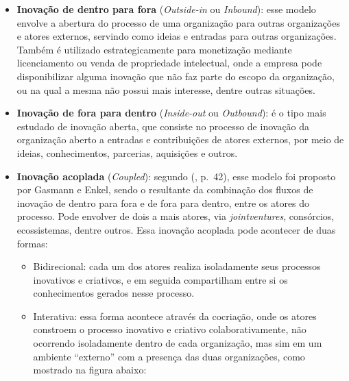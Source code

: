 \begin{itemize}
    \item \textbf{Inovação de dentro para fora} (\textit{Outside-in} ou \textit{Inbound}): esse modelo envolve a abertura do processo de uma organização para outras organizações e atores externos, servindo como ideias e entradas para outras organizações. Também é utilizado estrategicamente para monetização mediante licenciamento ou venda de propriedade intelectual, onde a empresa pode disponibilizar alguma inovação que não faz parte do escopo da organização, ou na qual a mesma não possui mais interesse, dentre outras situações.

    \item \textbf{Inovação de fora para dentro} (\textit{Inside-out} ou \textit{Outbound}): é o tipo mais estudado de inovação aberta, que consiste no processo de inovação da organização aberto a entradas e contribuições de atores externos, por meio de ideias, conhecimentos, parcerias, aquisições e outros.

    \item \begin{sloppypar}
    \textbf{Inovação acoplada} (\textit{Coupled}): segundo \citeauthor{chesbrough2014} (\citeyear{chesbrough2014}, p.~42), esse modelo foi proposto por Gasmann e Enkel, sendo o resultante da combinação dos fluxos de inovação de dentro para fora e de fora para dentro, entre os atores do processo. Pode envolver de dois a mais atores, via \textit{joint\-ventures}, consórcios, ecossistemas, dentre outros. Essa inovação acoplada pode acontecer de duas formas:
        \begin{itemize}
            \item Bidirecional: cada um dos atores realiza isoladamente seus processos inovativos e criativos, e em seguida compartilham entre si os conhecimentos gerados nesse processo.
            \item Interativa: essa forma acontece através da cocriação, onde os atores constroem o processo inovativo e criativo colaborativamente, não ocorrendo isoladamente dentro de cada organização, mas sim em um ambiente “externo” com a presença das duas organizações, como mostrado na figura abaixo:
            
        \end{itemize}
    \end{sloppypar}
\end{itemize}


